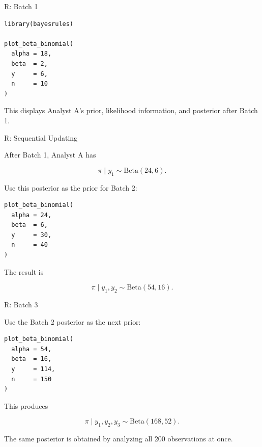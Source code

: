 \begin{frame}[fragile]{R: Batch 1}

\begin{verbatim}
library(bayesrules)

plot_beta_binomial(
  alpha = 18,
  beta  = 2,
  y     = 6,
  n     = 10
)
\end{verbatim}

This displays Analyst A's prior, likelihood information,
and posterior after Batch 1.

\end{frame}

\begin{frame}[fragile]{R: Sequential Updating}

After Batch 1, Analyst A has

\[
\pi \mid y_1 \sim \mathrm{Beta}(24,6).
\]

Use this posterior as the prior for Batch 2:

\begin{verbatim}
plot_beta_binomial(
  alpha = 24,
  beta  = 6,
  y     = 30,
  n     = 40
)
\end{verbatim}

The result is

\[
\pi \mid y_1,y_2
\sim
\mathrm{Beta}(54,16).
\]

\end{frame}

\begin{frame}[fragile]{R: Batch 3}

Use the Batch 2 posterior as the next prior:

\begin{verbatim}
plot_beta_binomial(
  alpha = 54,
  beta  = 16,
  y     = 114,
  n     = 150
)
\end{verbatim}

This produces

\[
\pi \mid y_1,y_2,y_3
\sim
\mathrm{Beta}(168,52).
\]

The same posterior is obtained by analyzing all 200 observations
at once.

\end{frame}

